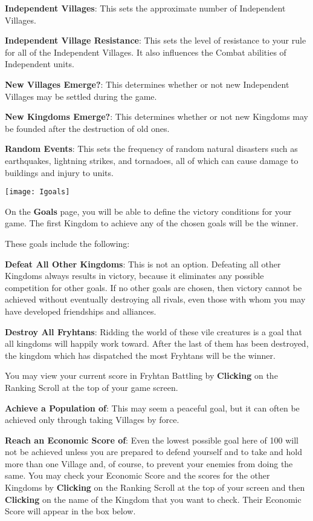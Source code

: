 \textbf{Independent Villages}: This sets the approximate number of Independent Villages.

\textbf{Independent Village Resistance}: This sets the level of resistance to your rule for all of the Independent Villages. It also influences the Combat abilities of Independent units.

\textbf{New Villages Emerge?}: This determines whether or not new Independent Villages may be settled during the game.

\textbf{New Kingdoms Emerge?}: This determines whether or not new Kingdoms may be founded after the destruction of old ones.

\textbf{Random Events}: This sets the frequency of random natural disasters such as earthquakes, lightning strikes, and tornadoes, all of which can cause damage to buildings and injury to units.


\begin{center}
    \texttt{[image: Igoals]} %
\end{center}

On the \textbf{Goals} page, you will be able to define the victory conditions for your game. The first Kingdom to achieve any of the chosen goals will be the winner.

These goals include the following:

\textbf{Defeat All Other Kingdoms}: This is not an option. Defeating all other Kingdoms always results in victory, because it eliminates any possible competition for other goals. If no other goals are chosen, then victory cannot be achieved without eventually destroying all rivals, even those with whom you may have developed friendships and alliances.

\textbf{Destroy All Fryhtans}: Ridding the world of these vile creatures is a goal that all kingdoms will happily work toward. After the last of them has been destroyed, the kingdom which has dispatched the most Fryhtans will be the winner.

You may view your current score in Fryhtan Battling by \textbf{Clicking} on the Ranking Scroll at the top of your game screen.

\textbf{Achieve a Population of}: This may seem a peaceful goal, but it can often be achieved only through taking Villages by force.

\textbf{Reach an Economic Score of}: Even the lowest possible goal here of 100 will not be achieved unless you are prepared to defend yourself and to take and hold more than one Village and, of course, to prevent your enemies from doing the same. You may check your Economic Score and the scores for the other Kingdoms by \textbf{Clicking} on the Ranking Scroll at the top of your screen and then \textbf{Clicking} on the name of the Kingdom that you want to check. Their Economic Score will appear in the box below.

